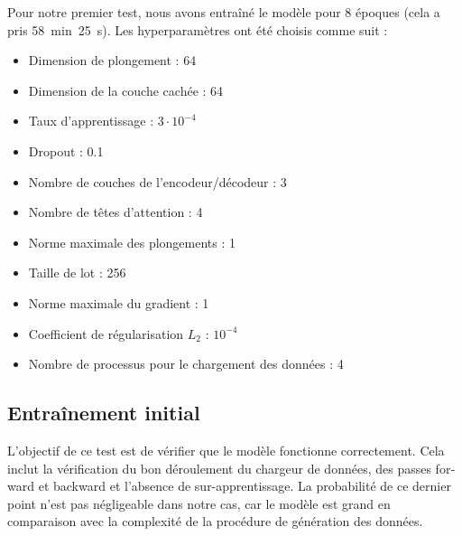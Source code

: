 Pour notre premier test, nous avons entraîné le modèle pour 8 époques (cela a pris 58~min~25~s).
Les hyperparamètres ont été choisis comme suit :
\begin{itemize}
    \item Dimension de plongement : 64
    \item Dimension de la couche cachée : 64
    \item Taux d'apprentissage : \(3 \cdot 10^{-4}\)
    \item Dropout : 0.1
    \item Nombre de couches de l'encodeur/décodeur : 3
    \item Nombre de têtes d'attention : 4
    \item Norme maximale des plongements : 1
    \item Taille de lot : 256
    \item Norme maximale du gradient : 1
    \item Coefficient de régularisation \(L_2\) : \(10^{-4}\)
    \item Nombre de processus pour le chargement des données : 4
\end{itemize}


\subsection{Entraînement initial}%
\label{sub.results.training.initial}

L'objectif de ce test est de vérifier que le modèle fonctionne correctement.
Cela inclut la vérification du bon déroulement du chargeur de données,
des passes \foreignlanguage{english}{forward} et \foreignlanguage{english}{backward}
et l'absence de sur-apprentissage.
La probabilité de ce dernier point n'est pas négligeable dans notre cas,
car le modèle est grand en comparaison avec la complexité de la procédure de génération des données.

